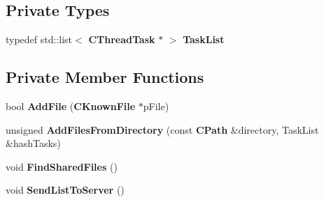 \subsection*{Private Types}
\begin{DoxyCompactItemize}
\item 
typedef std::list$<$ {\bf CThreadTask} $\ast$ $>$ {\bfseries TaskList}\label{classCSharedFileList_a041e656bfdfffca4ba649cf2eaafaf6f}

\end{DoxyCompactItemize}
\subsection*{Private Member Functions}
\begin{DoxyCompactItemize}
\item 
bool {\bfseries AddFile} ({\bf CKnownFile} $\ast$pFile)\label{classCSharedFileList_a99300f91d1079bdf6c681ee547deadd5}

\item 
unsigned {\bfseries AddFilesFromDirectory} (const {\bf CPath} \&directory, TaskList \&hashTasks)\label{classCSharedFileList_ad875784d254ce9de31be87a49a71abac}

\item 
void {\bfseries FindSharedFiles} ()\label{classCSharedFileList_ab132ad68180622c1cd01e6f349795efc}

\item 
void {\bfseries SendListToServer} ()\label{classCSharedFileList_a43f39b0452e30d02772659ddc6b9e943}

\end{DoxyCompactItemize}
